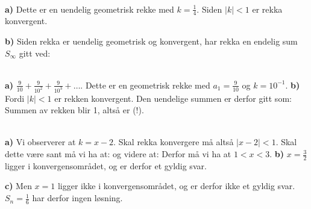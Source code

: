 \newpage
{}\\
\textbf{a)} Dette er en uendelig geometrisk rekke med $ k=\frac{1}{4} $. Siden $ |k|<1 $ er rekka konvergent.

\textbf{b)} Siden rekka er uendelig geometrisk og konvergent, har rekka en endelig sum $ S_\infty $ gitt ved:

 \\
\textbf{a)} $ {\frac{9}{10}+\frac{9}{10^2}+\frac{9}{10^3}+\ldots} $. Dette er en geometrisk rekke med $ {a_1 = \frac{9}{10}} $ og $ k=10^{-1} $.
\textbf{b)} Fordi $ {|k|<1 }$ er rekken konvergent. Den uendelige summen er derfor gitt som:
Summen av rekken blir 1, altså er  (!).

 \\
\textbf{a)} Vi observerer at ${ k=x-2} $. Skal rekka konvergere må altså $ {|x-2|<1} $. Skal dette være sant må vi ha at:
og videre at:
Derfor må vi ha at $ {1<x<3} $.
\newpage
\textbf{b)} 
$  {x=\frac{3}{2}} $ ligger i konvergensområdet, og er derfor et gyldig svar.

\textbf{c)} 
Men $  {x=1} $ ligger ikke i konvergensområdet, og er derfor ikke et gyldig svar. $ S_n=\frac{1}{6} $ har derfor ingen løsning.

